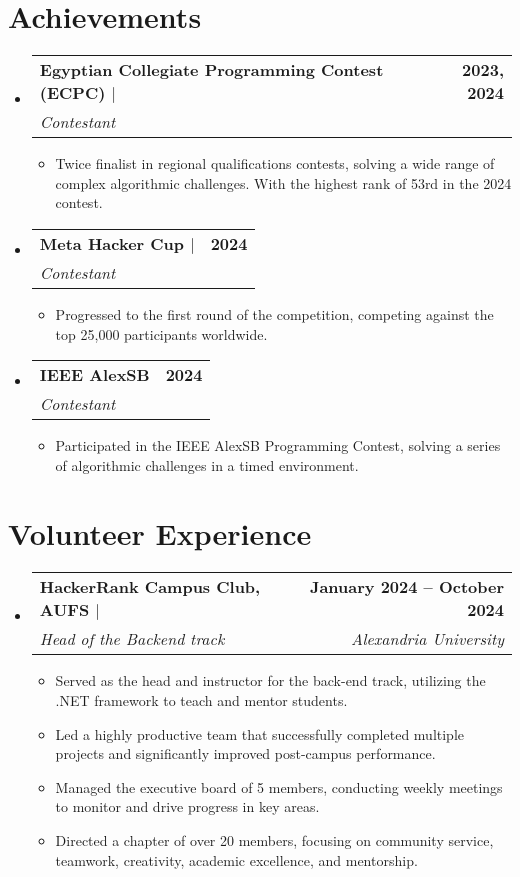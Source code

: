 \documentclass[letterpaper,11pt]{article}
\makeatletter
\newcommand{\resumeItem}[1]{
  \item\small{
    {#1 \vspace{-2pt}}
  }
}
\newcommand{\resumeSubheading}[4]{
  \vspace{-2pt}\item
    \begin{tabular*}{1.0\textwidth}[t]{l@{\extracolsep{\fill}}r}
      \textbf{#1} & \textbf{\small #2} \\
      \textit{\small#3} & \textit{\small #4} \\
    \end{tabular*}\vspace{-7pt}
}
\newcommand{\resumeSubHeadingListStart}{\begin{itemize}[leftmargin=0.0in, label={}]}
\newcommand{\resumeSubHeadingListEnd}{\end{itemize}}
\newcommand{\resumeItemListStart}{\begin{itemize}}
\newcommand{\resumeItemListEnd}{\end{itemize}\vspace{-5pt}}
\makeatother
\begin{document}
\section{Achievements}
  \resumeSubHeadingListStart
    \resumeSubheading
     {\textbf{Egyptian Collegiate Programming Contest (ECPC)} $|$ \href{https://icpc.global/ICPCID/8H1UPW16WJN6}{\faGlobe}}{2023, 2024} 
      {Contestant}{}
      \resumeItemListStart
        \resumeItem{Twice finalist in regional qualifications contests, solving a wide range of complex algorithmic challenges. With the highest rank of 53rd in the 2024 contest.}
      \resumeItemListEnd
    \resumeSubheading
    {\textbf{Meta Hacker Cup} $|$ \href{https://www.facebook.com/codingcompetitions/hacker-cup/2024/certificate/440863471706931}{\faGlobe}}{2024}
    {Contestant}{}
    \resumeItemListStart
    \resumeItem{Progressed to the first round of the competition, competing against the top 25,000 participants worldwide.}
    \resumeItemListEnd

    \resumeSubheading
    {IEEE AlexSB}{2024}
    {Contestant}{}
    \resumeItemListStart
    \resumeItem{Participated in the IEEE AlexSB Programming Contest, solving a series of algorithmic challenges in a timed environment.}
    \resumeItemListEnd

  \resumeSubHeadingListEnd



\section{Volunteer Experience}
  \resumeSubHeadingListStart
    \resumeSubheading
      {\textbf{HackerRank Campus Club, AUFS} $|$ \href{https://drive.google.com/file/d/1-1JKPCCBRHQc9hpw5VP9fcte8bFrEIiK/view?usp=sharing}{\faGlobe}}{January 2024 -- October 2024}
      {Head of the Backend track}{Alexandria University}
      \resumeItemListStart
        \resumeItem{Served as the head and instructor for the back-end track, utilizing the .NET framework to teach and mentor students.}
        \resumeItem{Led a highly productive team that successfully completed multiple projects and significantly improved post-campus performance.}
        \resumeItem{Managed the executive board of 5 members, conducting weekly meetings to monitor and drive progress in key areas.}
        \resumeItem{Directed a chapter of over 20 members, focusing on community service, teamwork, creativity, academic excellence, and mentorship.}
      \resumeItemListEnd
     
  \resumeSubHeadingListEnd
\end{document}
